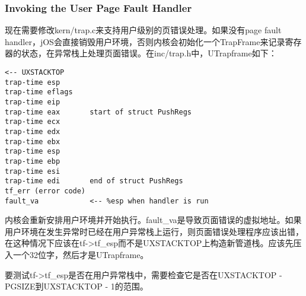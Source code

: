 \subsubsection{Invoking the User Page Fault Handler}
\par 现在需要修改kern/trap.c来支持用户级别的页错误处理。如果没有page fault handler，jOS会直接销毁用户环境，否则内核会初始化一个TrapFrame来记录寄存器的状态，在异常栈上处理页面错误。在inc/trap.h中，UTrapframe如下：
\begin{lstlisting}
<-- UXSTACKTOP
trap-time esp
trap-time eflags
trap-time eip
trap-time eax       start of struct PushRegs
trap-time ecx
trap-time edx
trap-time ebx
trap-time esp
trap-time ebp
trap-time esi
trap-time edi       end of struct PushRegs
tf_err (error code)
fault_va            <-- %esp when handler is run
\end{lstlisting}
\par 内核会重新安排用户环境并开始执行。fault\_va是导致页面错误的虚拟地址。如果用户环境在发生异常时已经在用户异常栈上运行，则页面错误处理程序应该出错，在这种情况下应该在tf->tf\_esp而不是UXSTACKTOP上构造新管道栈。应该先压入一个32位字，然后才是UTrapframe。
\par 要测试tf->tf\_esp是否在用户异常栈中，需要检查它是否在UXSTACKTOP - PGSIZE到UXSTACKTOP - 1的范围。


